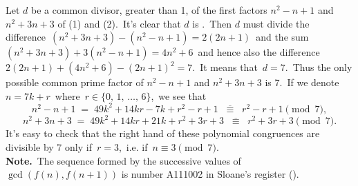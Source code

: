 \documentclass[12pt]{article}
\theoremstyle{definition}
\begin{document}
Let $d$ be a common divisor, greater than 1, of the first factors $n^2\!-\!n\!+\!1$ and $n^2\!+\!3n\!+\!3$ of (1) and (2).\, It's clear that $d$ is .\, Then $d$ must divide the difference\, $(n^2\!+\!3n\!+\!3)-(n^2\!-\!n\!+\!1) = 2(2n\!+\!1)$\, and the sum\, $(n^2\!+\!3n\!+\!3)+3(n^2\!-\!n\!+\!1)= 4n^2\!+\!6$\, and hence also the difference\, $2(2n\!+\!1)+(4n^2\!+\!6)-(2n\!+\!1)^2 = 7$.\, It means that\, $d = 7$.\, Thus the only possible common prime factor of $n^2\!-\!n\!+\!1$ and $n^2\!+\!3n\!+\!3$ is 7.\, If we denote\, $n = 7k+r$\, where\, $r\in\{0,\,1,\,\ldots,\,6\}$,\, we see that
$$n^2\!-\!n\!+\!1 \;=\; 49k^2\!+\!14kr\!-\!7k\!+\!r^2\!-\!r\!+\!1 \;\;\overline{\equiv}\;\; r^2\!-\!r\!+\!1 \pmod{7},$$
$$n^2\!+\!3n\!+\!3 \;=\; 49k^2\!+\!14kr\!+\!21k\!+\!r^2\!+\!3r\!+\!3 \;\;\overline{\equiv}\;\; r^2\!+\!3r\!+\!3 \pmod{7}.$$
It's easy to check that the right hand  of these polynomial congruences are divisible by 7 only if\, $r = 3$,\, i.e. if\, $n \equiv 3 \pmod{7}$.\\

\textbf{Note.}\, The sequence formed by the successive values 
of\, $\gcd(f(n), f(n\!+\!1))$ is number A111002 in Sloane's 
register ().
\end{document}
